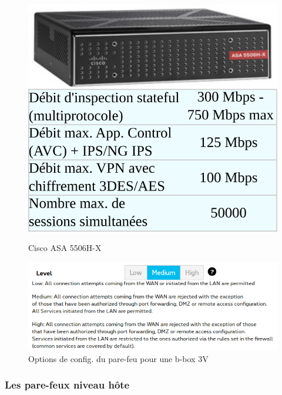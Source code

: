 \documentclass[]{article}
\begin{document}
\begin{figure}[!ht]
\centering
\begin{minipage}{.4\textwidth}
  \centering
  \includegraphics[width=.6\linewidth]{desc_cisco_ASA-5506H-X.png}
  \caption{Cisco ASA 5506H-X}
  \label{cisco_FW}
\end{minipage}%
\begin{minipage}{.6\textwidth}
  \centering
  \includegraphics[width=1.0\linewidth]{proximus_FW.png}
  \caption{Options de config. du pare-feu pour une b-box 3V}
  \label{proxi_FW}
\end{minipage}
\end{figure}


\subsubsection{Les pare-feux niveau hôte}\label{host_fw}
\end{document}
